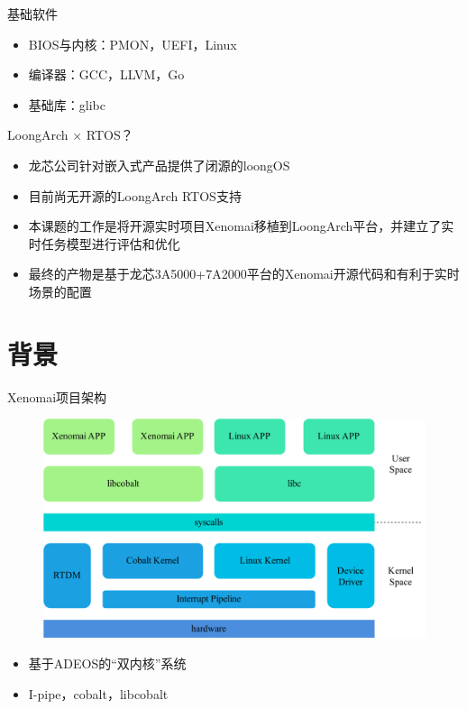 \documentclass{beamer}
\begin{document}
\begin{frame}{基础软件}
    \begin{itemize}
        \item BIOS与内核：PMON，UEFI，Linux
        \item 编译器：GCC，LLVM，Go
        \item 基础库：glibc
    \end{itemize}
\end{frame}

\begin{frame}{LoongArch $\times$ RTOS？}
    \begin{itemize}
        \item 龙芯公司针对嵌入式产品提供了闭源的loongOS
        \item 目前尚无开源的LoongArch RTOS支持
        \item 本课题的工作是将开源实时项目Xenomai移植到LoongArch平台，并建立了实时任务模型进行评估和优化
        \item 最终的产物是基于龙芯3A5000+7A2000平台的Xenomai开源代码和有利于实时场景的配置
    \end{itemize}
\end{frame}

\section{背景}

\begin{frame}{Xenomai项目架构}
    \begin{minipage}{0.45\linewidth}
        \begin{figure}[h]
            \centering
            \includegraphics[height=.45\textheight]{img/Img/xenomai-prj.pdf}
        \end{figure}
    \end{minipage}\hspace{1.5cm}
    \begin{minipage}{0.35\linewidth}
        \begin{itemize}
            \item 基于ADEOS的“双内核”系统
            \item I-pipe，cobalt，libcobalt
        \end{itemize}
    \end{minipage}
    \medskip
\end{frame}
\end{document}

